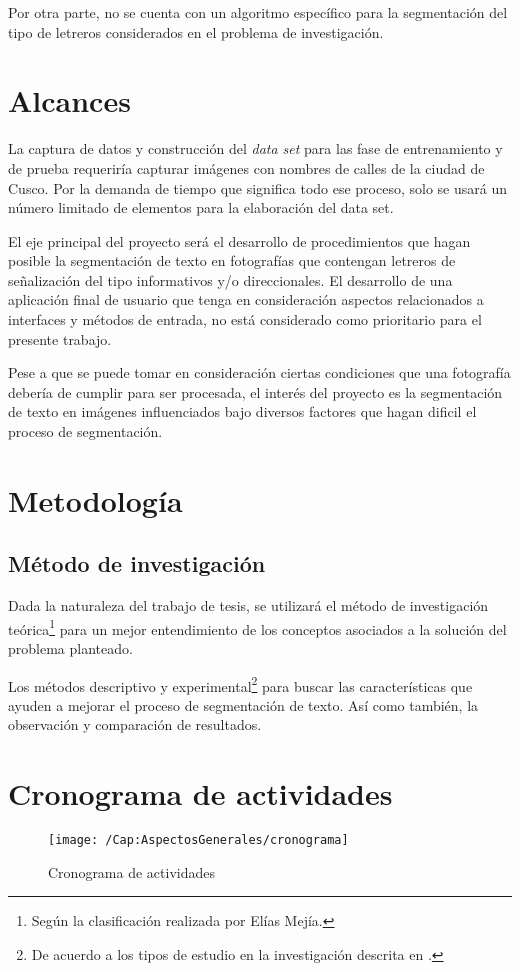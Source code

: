 	Por otra parte, no se cuenta con un algoritmo específico para la segmentación
del tipo de letreros considerados en el problema de investigación.

\section{Alcances}
  La captura de datos y construcción del \textit{data set} para las fase de
entrenamiento y de prueba requeriría capturar imágenes con nombres de calles de
la ciudad de Cusco. Por la demanda de tiempo que significa todo ese proceso,
solo se usará un número limitado de elementos para la elaboración del data set.

  El eje principal del proyecto será el desarrollo de procedimientos que hagan
posible la segmentación de texto en fotografías que contengan letreros de
señalización del tipo informativos y/o direccionales. El desarrollo de una
aplicación final de usuario que tenga en consideración aspectos relacionados a
interfaces y métodos de entrada, no está considerado como prioritario para el
presente trabajo.
  
  Pese a que se puede tomar en consideración ciertas condiciones que una
fotografía debería de cumplir para ser procesada, el interés del proyecto es la
segmentación de texto en imágenes influenciados bajo diversos factores que hagan
dificil el proceso de segmentación.
  
\section{Metodología}
  \subsection{Método de investigación}
  Dada la naturaleza del trabajo de tesis, se utilizará el método de
investigación teórica\footnote{Según la clasificación realizada por Elías
Mejía\citep{Mejia:2005:MIC}.} para un mejor entendimiento de los conceptos
asociados a la solución del problema planteado. 
  
  Los métodos descriptivo y experimental\footnote{De acuerdo a los tipos de
estudio en la investigación descrita en \citep{Hernandez:1999:MI}.} para buscar
las características que ayuden a mejorar el proceso de segmentación de texto.
Así como también, la observación y comparación de resultados.

\section{Cronograma de actividades}
  \begin{figure}[h!]
    \centering
	  \texttt{[image: /Cap:AspectosGenerales/cronograma]}
	  \caption{Cronograma de actividades}
	  \label{Fig:Cap:AspectosGenerales:Cronograma}
	\end{figure}
